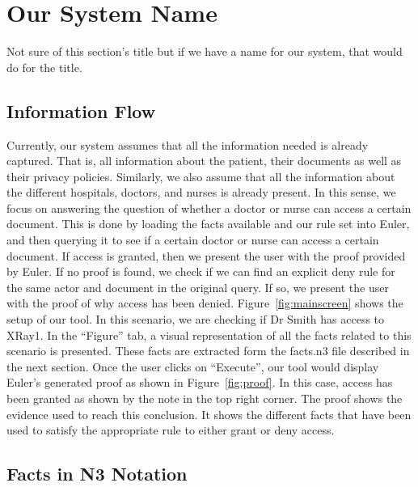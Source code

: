 \documentclass[conference]{IEEEtran}
\begin{document}
\section{Our System Name}
\label{main-sys}

Not sure of this section's title but if we have a name for our system, that would do for the title. 

\subsection{Information Flow}
\label{info-flow}

Currently, our system assumes that all the information needed is already captured. That is, all information about the patient, their documents as well as their
privacy policies. Similarly, we also assume that all the information about the different hospitals, doctors, and nurses is already present. In this sense, we
focus on answering the question of whether a doctor or nurse can access a certain document. This is done by loading the facts available and our rule set into
Euler, and then querying it to see if a certain doctor or nurse can access a certain document. If access is granted, then we present the user with the proof
provided by Euler. If no proof is found, we check if we can find an explicit deny rule for the same actor and document in the original query. If so, we present
the user with the proof of why access has been denied. Figure~\ref{fig:mainscreen} shows the setup of our tool. In this scenario, we are checking if Dr Smith
has access to XRay1. In the ``Figure'' tab, a visual representation of all the facts related to this scenario is presented. These facts are extracted form
the facts.n3 file described in the next section. Once the user clicks on
``Execute'', our tool would display Euler's generated proof as shown in Figure~\ref{fig:proof}. In this case, access has been granted as shown by the note in
the top right corner. The proof shows the evidence used to reach this conclusion. It shows the different facts that have been used to satisfy the appropriate
rule to either grant or deny access.



\subsection{Facts in N3 Notation}
\end{document}
